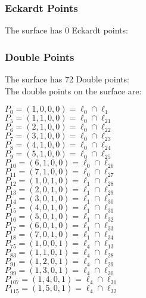 \documentclass{article}
\begin{document}
{\subsubsection*{Eckardt Points}
The surface has 0 Eckardt points:\\
\subsubsection*{Double Points}
The surface has 72 Double points:\\
The double points on the surface are:\\
\begin{multicols}{2}
\noindent
$P_{0} = ( 1, 0, 0, 0 ) = \ell_{0} \cap \ell_{1} $\\
$P_{5} = ( 1, 1, 0, 0 ) = \ell_{0} \cap \ell_{21} $\\
$P_{6} = ( 2, 1, 0, 0 ) = \ell_{0} \cap \ell_{22} $\\
$P_{7} = ( 3, 1, 0, 0 ) = \ell_{0} \cap \ell_{23} $\\
$P_{8} = ( 4, 1, 0, 0 ) = \ell_{0} \cap \ell_{24} $\\
$P_{9} = ( 5, 1, 0, 0 ) = \ell_{0} \cap \ell_{25} $\\
$P_{10} = ( 6, 1, 0, 0 ) = \ell_{0} \cap \ell_{26} $\\
$P_{11} = ( 7, 1, 0, 0 ) = \ell_{0} \cap \ell_{27} $\\
$P_{12} = ( 1, 0, 1, 0 ) = \ell_{1} \cap \ell_{28} $\\
$P_{13} = ( 2, 0, 1, 0 ) = \ell_{1} \cap \ell_{29} $\\
$P_{14} = ( 3, 0, 1, 0 ) = \ell_{1} \cap \ell_{30} $\\
$P_{15} = ( 4, 0, 1, 0 ) = \ell_{1} \cap \ell_{31} $\\
$P_{16} = ( 5, 0, 1, 0 ) = \ell_{1} \cap \ell_{32} $\\
$P_{17} = ( 6, 0, 1, 0 ) = \ell_{1} \cap \ell_{33} $\\
$P_{18} = ( 7, 0, 1, 0 ) = \ell_{1} \cap \ell_{34} $\\
$P_{75} = ( 1, 0, 0, 1 ) = \ell_{4} \cap \ell_{13} $\\
$P_{83} = ( 1, 1, 0, 1 ) = \ell_{4} \cap \ell_{28} $\\
$P_{91} = ( 1, 2, 0, 1 ) = \ell_{4} \cap \ell_{29} $\\
$P_{99} = ( 1, 3, 0, 1 ) = \ell_{4} \cap \ell_{30} $\\
$P_{107} = ( 1, 4, 0, 1 ) = \ell_{4} \cap \ell_{31} $\\
$P_{115} = ( 1, 5, 0, 1 ) = \ell_{4} \cap \ell_{32} $\\

\end{multicols}}
\end{document}
